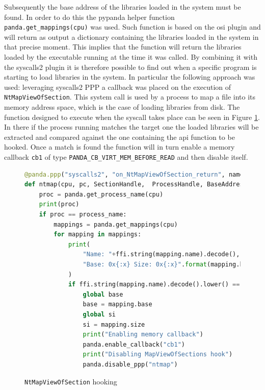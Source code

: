 Subsequently the base address of the libraries loaded in the system must be found. In order to do this the pypanda helper function \lstinline{panda.get_mappings(cpu)} was used. Such function is based on the osi plugin and will return as output a dictionary containing the libraries loaded in the system in that precise moment. This implies that the function will return the libraries loaded by the executable running at the time it was called. By combining it with the syscalls2 plugin it is therefore possible to find out when a specific program is starting to load libraries in the system. In particular the following approach was used: leveraging syscalls2 PPP a callback was placed on the execution of \lstinline{NtMapViewOfSection}. This system call is used by a process to map a file into its memory address space, which is the case of loading libraries from disk. The function designed to execute when the syscall takes place can be seen in Figure \ref{fig:ntmap}. In there if the process running matches the target one the loaded libraries will be extracted and compared against the one containing the api function to be hooked. Once a match is found the function will in turn enable a memory callback \lstinline{cb1} of type \lstinline{PANDA_CB_VIRT_MEM_BEFORE_READ} and then disable itself.

\begin{figure}[htp]
\centering
\begin{lstlisting}[language=Python] 
@panda.ppp("syscalls2", "on_NtMapViewOfSection_return", name="ntmap")
def ntmap(cpu, pc, SectionHandle,  ProcessHandle, BaseAddress, ZeroBits, CommitSize, SectionOffset, ViewSize, InheritDisposition, AllocationType, Win32Protect):
    proc = panda.get_process_name(cpu)
    print(proc)
    if proc == process_name:
        mappings = panda.get_mappings(cpu)
        for mapping in mappings:
            print(
                "Name: "+ffi.string(mapping.name).decode(),
                "Base: 0x{:x} Size: 0x{:x}".format(mapping.base,mapping.size)
            )
            if ffi.string(mapping.name).decode().lower() == "kernel32.dll":
                global base
                base = mapping.base
                global si
                si = mapping.size
                print("Enabling memory callback")
                panda.enable_callback("cb1")
                print("Disabling MapViewOfSections hook")
                panda.disable_ppp("ntmap")
\end{lstlisting}
\caption{\lstinline{NtMapViewOfSection} hooking}
\label{fig:ntmap}
\end{figure}

